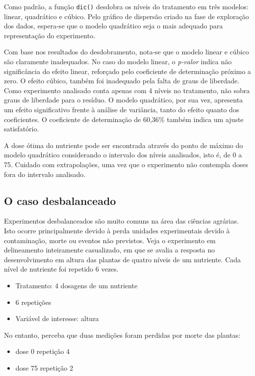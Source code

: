 \documentclass[
]{article}
\providecommand{\tightlist}{%
  \setlength{\itemsep}{0pt}\setlength{\parskip}{0pt}}
\begin{document}
Como padrão, a função \texttt{dic()} desdobra os níveis do tratamento em três modelos: linear, quadrático e cúbico. Pelo gráfico de dispersão criado na fase de exploração dos dados, espera-se que o modelo quadrático seja o mais adequado para representação do experimento.

Com base nos resultados do desdobramento, nota-se que o modelo linear e cúbico são claramente inadequados. No caso do modelo linear, o \emph{p-valor} indica não significância do efeito linear, reforçado pelo coeficiente de determinação próximo a zero. O efeito cúbico, também foi inadequado pela falta de graus de liberdade. Como experimento analisado conta apenas com 4 níveis no tratamento, não sobra graus de liberdade para o resíduo. O modelo quadrático, por sua vez, apresenta um efeito significativo frente à análise de variância, tanto do efeito quanto dos coeficientes. O coeficiente de determinação de 60,36\% também indica um ajuste satisfatório.

A dose ótima do nutriente pode ser encontrada através do ponto de máximo do modelo quadrático considerando o intervalo dos níveis analisados, isto é, de 0 a 75. Cuidado com extrapolações, uma vez que o experimento não contempla doses fora do intervalo analisado.

\hypertarget{o-caso-desbalanceado}{%
\subsection{O caso desbalanceado}\label{o-caso-desbalanceado}}

Experimentos desbalanceados são muito comuns na área das ciências agrárias. Isto ocorre principalmente devido à perda unidades experimentais devido à contaminação, morte ou eventos não previstos. Veja o experimento em delineamento inteiramente casualizado, em que se avalia a resposta no desenvolvimento em altura das plantas de quatro níveis de um nutriente. Cada nível de nutriente foi repetido 6 vezes.

\begin{itemize}
\tightlist
\item
  Tratamento: 4 dosagens de um nutriente
\item
  6 repetições
\item
  Variável de interesse: altura
\end{itemize}

No entanto, perceba que duas medições foram perdidas por morte das plantas:

\begin{itemize}
\tightlist
\item
  dose 0 repetição 4
\item
  dose 75 repetição 2
\end{itemize}
\end{document}
